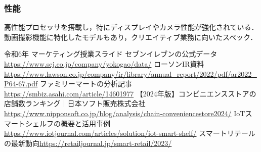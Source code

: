 \documentclass[titlepage,a4paper]{jsarticle}
\begin{document}
\subsubsection{性能}
高性能プロセッサを搭載し，特にディスプレイやカメラ性能が強化されている．
動画撮影機能に特化したモデルもあり，クリエイティブ業務に向いたスペック．
\begin{thebibliography}{99}
   令和6年 マーケティング授業スライド
   セブンイレブンの公式データ\url{https://www.sej.co.jp/company/yokogao/data/}
   ローソンIR資料\url{https://www.lawson.co.jp/company/ir/library/annual_report/2022/pdf/ar2022_P64-67.pdf}
   ファミリーマートの分析記事\url{https://smbiz.asahi.com/article/14601977}
   【2024年版】コンビニエンスストアの店舗数ランキング｜日本ソフト販売株式会社\url{https://www.nipponsoft.co.jp/blog/analysis/chain-conveniencestore2024/}
   IoTスマートシェルフの概要と活用事例 \url{https://www.iotjournal.com/articles/solution/iot-smart-shelf/}
   スマートリテールの最新動向\url{https://retailjournal.jp/smart-retail/2023/}
\end{thebibliography}
\end{document}

